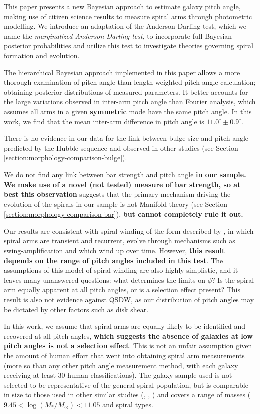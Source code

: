 \label{section:summary}
This paper presents a new Bayesian approach to estimate galaxy pitch angle, making use of citizen science results to measure spiral arms through photometric modelling. We introduce an adaptation of the Anderson-Darling test, which we name the \textit{marginalized Anderson-Darling test}, to incorporate full Bayesian posterior probabilities and utilize this test to investigate theories governing spiral formation and evolution.

The hierarchical Bayesian approach implemented in this paper allows a more thorough examination of pitch angle than length-weighted pitch angle calculation; obtaining posterior distributions of measured parameters. It better accounts for the large variations observed in inter-arm pitch angle than Fourier analysis, which assumes all arms in a given \textbf{symmetric} mode have the same pitch angle. In this work, we find that the mean inter-arm difference in pitch angle is $11.0^\circ\pm 0.9^\circ$.

There is no evidence in our data for the link between bulge size and pitch angle predicted by the Hubble sequence and observed in other studies (see Section \ref{section:morphology-comparison-bulge}).

We do not find any link between bar strength and pitch angle \textbf{in our sample. We make use of a novel (not tested) measure of bar strength, so at best this observation} suggests that the primary mechanism driving the evolution of the spirals in our sample is not Manifold theory (see Section \ref{section:morphology-comparison-bar}), \textbf{but cannot completely rule it out.}

Our results are consistent with spiral winding of the form described by \citet{2019arXiv190910291P}, in which spiral arms are transient and recurrent, evolve through mechanisms such as swing-amplification \citep{1965MNRAS.130..125G} and which wind up over time. However, \textbf{this result depends on the range of pitch angles included in this test}. The assumptions of this model of spiral winding are also highly simplistic, and it leaves many unanswered questions: what determines the limits on $\phi$? Is the spiral arm equally apparent at all pitch angles, or is a selection effect present? This result is also not evidence against QSDW, as our distribution of pitch angles may be dictated by other factors such as disk shear.

In this work, we assume that spiral arms are equally likely to be identified and recovered at all pitch angles, \textbf{which suggests the absence of galaxies at low pitch angles is not a selection effect}. This is not an unfair assumption given the amount of human effort that went into obtaining spiral arm measurements (more so than any other pitch angle measurement method, with each galaxy receiving at least 30 human classifications). The galaxy sample used is not selected to be representative of the general spiral population, but is comparable in size to those used in other similar studies (\citealt{2013MNRAS.436.1074S}, \citealt{2019ApJ...871..194Y}, \citealt{2019arXiv190910291P}) and covers a range of masses ($9.45 < \log(M_* / M_\odot) < 11.05$ and spiral types.

